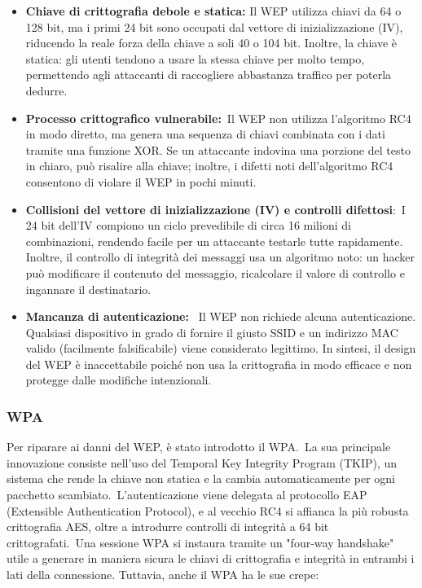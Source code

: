\documentclass{article}
\begin{document}
\begin{itemize}
    \item \textbf{Chiave di crittografia debole e statica:} Il WEP utilizza chiavi da 64 o 128 bit, ma i primi 24 bit sono occupati dal vettore di inizializzazione (IV), riducendo la reale forza della chiave a soli 40 o 104 bit. Inoltre, la chiave è statica: gli utenti tendono a usare la stessa chiave per molto tempo, permettendo agli attaccanti di raccogliere abbastanza traffico per poterla dedurre.
    \item \textbf{Processo crittografico vulnerabile:} Il WEP non utilizza l'algoritmo RC4 in modo diretto, ma genera una sequenza di chiavi combinata con i dati tramite una funzione XOR. Se un attaccante indovina una porzione del testo in chiaro, può risalire alla chiave; inoltre, i difetti noti dell'algoritmo RC4 consentono di violare il WEP in pochi minuti.
    \item \textbf{Collisioni del vettore di inizializzazione (IV) e controlli difettosi}: I 24 bit dell'IV compiono un ciclo prevedibile di circa 16 milioni di combinazioni, rendendo facile per un attaccante testarle tutte rapidamente. Inoltre, il controllo di integrità dei messaggi usa un algoritmo noto: un hacker può modificare il contenuto del messaggio, ricalcolare il valore di controllo e ingannare il destinatario.
    \item \textbf{Mancanza di autenticazione:}  Il WEP non richiede alcuna autenticazione. Qualsiasi dispositivo in grado di fornire il giusto SSID e un indirizzo MAC valido (facilmente falsificabile) viene considerato legittimo. In sintesi, il design del WEP è inaccettabile poiché non usa la crittografia in modo efficace e non protegge dalle modifiche intenzionali.
\end{itemize}

\subsubsection*{WPA}

Per riparare ai danni del WEP, è stato introdotto il WPA. La sua principale innovazione consiste nell'uso del Temporal Key Integrity Program (TKIP), un sistema che rende la chiave non statica e la cambia automaticamente per ogni pacchetto scambiato. L'autenticazione viene delegata al protocollo EAP (Extensible Authentication Protocol), e al vecchio RC4 si affianca la più robusta crittografia AES, oltre a introdurre controlli di integrità a 64 bit crittografati. Una sessione WPA si instaura tramite un "four-way handshake" utile a generare in maniera sicura le chiavi di crittografia e integrità in entrambi i lati della connessione. Tuttavia, anche il WPA ha le sue crepe:
\end{document}
